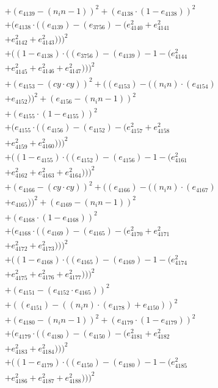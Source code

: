 \documentclass[10pt, a4paper]{article}
\begin{document}
\begin{small}
\begin{align*}
& + (e_{4139} - (n_in - 1))^{2} + (e_{4138}  \cdot  (1 - e_{4138}))^{2} \\
& + (e_{4138}  \cdot  ((e_{4139}) - (e_{3756}) - (e_{4140}^{2} + e_{4141}^{2} \\
& + e_{4142}^{2} + e_{4143}^{2})))^{2} \\
& + ((1 - e_{4138})  \cdot  ((e_{3756}) - (e_{4139}) - 1 - (e_{4144}^{2} \\
& + e_{4145}^{2} + e_{4146}^{2} + e_{4147}^{2})))^{2} \\
& + (e_{4153} - (cy  \cdot  cy))^{2} + ((e_{4153}) - ((n_in)  \cdot  (e_{4154}) \\
& + e_{4152}))^{2} + (e_{4156} - (n_in - 1))^{2} \\
& + (e_{4155}  \cdot  (1 - e_{4155}))^{2} \\
& + (e_{4155}  \cdot  ((e_{4156}) - (e_{4152}) - (e_{4157}^{2} + e_{4158}^{2} \\
& + e_{4159}^{2} + e_{4160}^{2})))^{2} \\
& + ((1 - e_{4155})  \cdot  ((e_{4152}) - (e_{4156}) - 1 - (e_{4161}^{2} \\
& + e_{4162}^{2} + e_{4163}^{2} + e_{4164}^{2})))^{2} \\
& + (e_{4166} - (cy  \cdot  cy))^{2} + ((e_{4166}) - ((n_in)  \cdot  (e_{4167}) \\
& + e_{4165}))^{2} + (e_{4169} - (n_in - 1))^{2} \\
& + (e_{4168}  \cdot  (1 - e_{4168}))^{2} \\
& + (e_{4168}  \cdot  ((e_{4169}) - (e_{4165}) - (e_{4170}^{2} + e_{4171}^{2} \\
& + e_{4172}^{2} + e_{4173}^{2})))^{2} \\
& + ((1 - e_{4168})  \cdot  ((e_{4165}) - (e_{4169}) - 1 - (e_{4174}^{2} \\
& + e_{4175}^{2} + e_{4176}^{2} + e_{4177}^{2})))^{2} \\
& + (e_{4151} - (e_{4152}  \cdot  e_{4165}))^{2} \\
& + ((e_{4151}) - ((n_in)  \cdot  (e_{4178}) + e_{4150}))^{2} \\
& + (e_{4180} - (n_in - 1))^{2} + (e_{4179}  \cdot  (1 - e_{4179}))^{2} \\
& + (e_{4179}  \cdot  ((e_{4180}) - (e_{4150}) - (e_{4181}^{2} + e_{4182}^{2} \\
& + e_{4183}^{2} + e_{4184}^{2})))^{2} \\
& + ((1 - e_{4179})  \cdot  ((e_{4150}) - (e_{4180}) - 1 - (e_{4185}^{2} \\
& + e_{4186}^{2} + e_{4187}^{2} + e_{4188}^{2})))^{2} \\

\end{align*}
\end{small}
\end{document}
